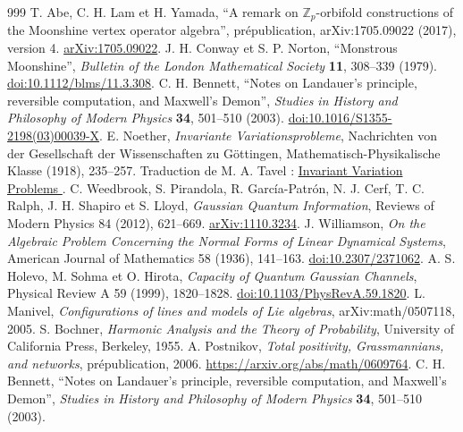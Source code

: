 \begin{thebibliography}{999}
 T. Abe, C. H. Lam et H. Yamada, ``A remark on \(\mathbb Z_p\)-orbifold constructions of the Moonshine vertex operator algebra'', prépublication, arXiv:1705.09022 (2017), version 4. \href{https://arxiv.org/abs/1705.09022v4}{arXiv:1705.09022}.
 J. H. Conway et S. P. Norton, ``Monstrous Moonshine'', \emph{Bulletin of the London Mathematical Society} \textbf{11}, 308--339 (1979). \href{https://doi.org/10.1112/blms/11.3.308}{doi:10.1112/blms/11.3.308}.
 C. H. Bennett, ``Notes on Landauer's principle, reversible computation, and Maxwell's Demon'', \emph{Studies in History and Philosophy of Modern Physics} \textbf{34}, 501--510 (2003). \href{https://doi.org/10.1016/S1355-2198(03)00039-X}{doi:10.1016/S1355-2198(03)00039-X}.
E. Noether, \emph{Invariante Variationsprobleme}, Nachrichten von der Gesellschaft der Wissenschaften zu Göttingen, Mathematisch-Physikalische Klasse (1918), 235--257. Traduction de M. A. Tavel : \href{https://arxiv.org/abs/physics/0503066}{Invariant Variation Problems
}.
C. Weedbrook, S. Pirandola, R. García-Patrón, N. J. Cerf, T. C. Ralph, J. H. Shapiro et S. Lloyd, \emph{Gaussian Quantum Information}, Reviews of Modern Physics 84 (2012), 621--669. \href{https://arxiv.org/abs/1110.3234}{arXiv:1110.3234}.
J. Williamson, \emph{On the Algebraic Problem Concerning the Normal Forms of Linear Dynamical Systems}, American Journal of Mathematics 58 (1936), 141--163. \href{https://doi.org/10.2307/2371062}{doi:10.2307/2371062}.
A. S. Holevo, M. Sohma et O. Hirota, \emph{Capacity of Quantum Gaussian Channels}, Physical Review A 59 (1999), 1820--1828. \href{https://doi.org/10.1103/PhysRevA.59.1820}{doi:10.1103/PhysRevA.59.1820}.
 L. Manivel, \emph{Configurations of lines and models of Lie algebras}, arXiv:math/0507118, 2005.
 S. Bochner, \emph{Harmonic Analysis and the Theory of Probability}, University of California Press, Berkeley, 1955.
A. Postnikov, \emph{Total positivity, Grassmannians, and networks},
prépublication, 2006. \url{https://arxiv.org/abs/math/0609764}.
 C. H. Bennett, ``Notes on Landauer's principle,
reversible computation, and Maxwell's Demon'', \emph{Studies in History
and Philosophy of Modern Physics} \textbf{34}, 501--510 (2003).

\end{thebibliography}
